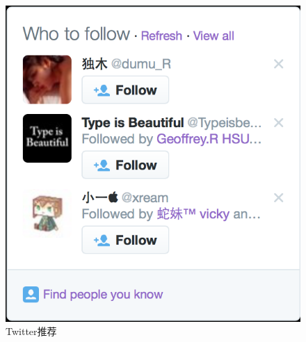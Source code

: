 \begin{figure}[h] 
\begin{minipage}[t]{0.45\linewidth}
\centering
\includegraphics[width=\textwidth]{img/chap1/twitter_recommend.png}
\caption{Twitter推荐 \label{Twitter推荐}}
\end{minipage}
\hfill
\begin{minipage}[t]{0.45\linewidth}
\centering

\end{minipage}
\end{figure}
